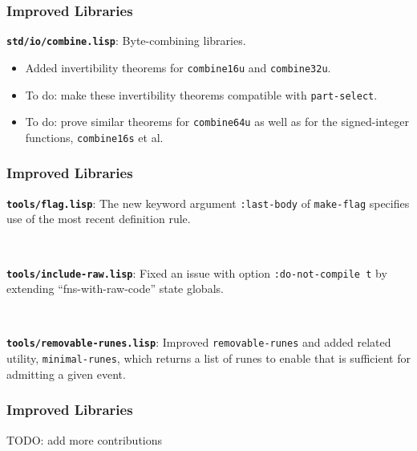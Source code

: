 \documentclass{beamer}
\newcommand{\code}[1]{\texttt{#1}}
\newcommand{\bookpath}[1]{\textbf{\code{#1}}}
\newcommand{\implibtitle}{\frametitle{Improved Libraries}}
\begin{document}

\begin{frame}

\implibtitle

\bookpath{std/io/combine.lisp}:
Byte-combining libraries.
\begin{itemize}
\item
Added invertibility theorems for \code{combine16u} and \code{combine32u}.
\item
To do: make these invertibility theorems compatible with \code{part-select}.
\item
To do: prove similar theorems for \code{combine64u} as well as for the
signed-integer functions, \code{combine16s} et al.
\end{itemize}

\end{frame}


\begin{frame}

\implibtitle

\bookpath{tools/flag.lisp}:
The new keyword argument \code{:last-body} of \code{make-flag}
specifies use of the most recent definition rule.

\

\bookpath{tools/include-raw.lisp}:
Fixed an issue with option \code{:do-not-compile t} by extending
``fns-with-raw-code'' state globals.

\

\bookpath{tools/removable-runes.lisp}:
Improved \code{removable-runes} and added related utility,
\code{minimal-runes}, which returns a list of runes to enable that is
sufficient for admitting a given event.

\end{frame}


\begin{frame}

\implibtitle

TODO: add more contributions

\end{frame}

\end{document}
